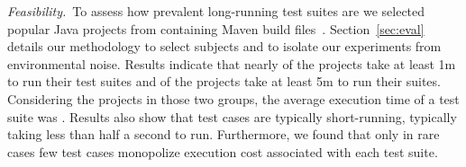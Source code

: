 



\vspace{1ex}\noindent\emph{Feasibility.}~To assess how prevalent
long-running test suites are we selected \numSubjs{} popular Java
projects from \github{} containing Maven build files~\cite{maven}.
Section~\ref{sec:eval} details our methodology to select subjects and
to isolate our experiments from environmental noise.  Results indicate
that nearly \percentMedLongRunning{} of the projects take at least 1m
to run their test suites and \percentLongRunning{} of the projects
take at least 5m to run their suites.  Considering the \numMedLong{}
projects in those two groups, the average execution time of a test
suite was \averageMedLongRunning{}.  Results also show that test cases
are typically short-running, typically taking less than half a second
to run.  Furthermore, we found that only in rare cases few test cases
monopolize execution cost associated with each test suite.



